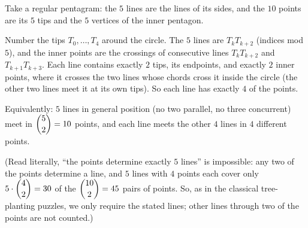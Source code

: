 Take a regular pentagram: the $5$ lines are the lines of its sides, and the $10$ points are its $5$ tips and the $5$ vertices of the inner pentagon.


Number the tips $T_0,\dots,T_4$ around the circle. The $5$ lines are $T_kT_{k+2}$ (indices mod $5$), and the inner points are the crossings of consecutive lines $T_kT_{k+2}$ and $T_{k+1}T_{k+3}$. Each line contains exactly $2$ tips, its endpoints, and exactly $2$ inner points, where it crosses the two lines whose chords cross it inside the circle (the other two lines meet it at its own tips). So each line has exactly $4$ of the points.

Equivalently: $5$ lines in general position (no two parallel, no three concurrent) meet in $\dbinom52=10$ points, and each line meets the other $4$ lines in $4$ different points.

(Read literally, ``the points determine exactly $5$ lines'' is impossible: any two of the points determine a line, and $5$ lines with $4$ points each cover only $5\cdot\dbinom{4}{2}=30$ of the $\dbinom{10}{2}=45$ pairs of points. So, as in the classical tree-planting puzzles, we only require the stated lines; other lines through two of the points are not counted.)
